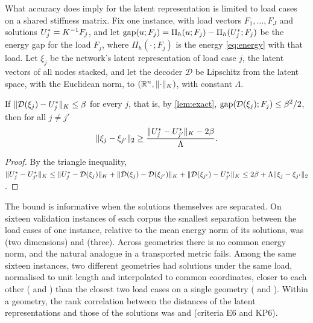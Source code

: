 What accuracy does imply for the latent representation is limited to load cases on a
shared stiffness matrix. Fix one instance, with load vectors $F_1,\dots,F_J$ and solutions
$U^{\ast}_j=K^{-1}F_j$, and let $\operatorname{gap}(u;F_j)=\Pi_h(u;F_j)-\Pi_h(U^{\ast}_j;F_j)$ be the energy
gap for the load $F_j$, where $\Pi_h(\cdot\,;F_j)$ is the energy \eqref{eq:energy} with that
load. Let $\xi_j$ be the network's latent representation of load case $j$, the latent vectors
of all nodes stacked, and let the decoder $\mathcal{D}$ be Lipschitz from the latent space, with the
Euclidean norm, to $(\mathbb{R}^{n},\lVert \cdot\rVert_K)$, with constant $\Lambda$.

\begin{proposition}\label{prop:sep}
If $\lVert \mathcal{D}(\xi_j)-U^{\ast}_j\rVert_K\le\beta$ for every $j$, that is, by \cref{lem:exact},
$\operatorname{gap}(\mathcal{D}(\xi_j);F_j)\le\beta^2/2$, then for all $j\neq j'$
\begin{equation}
\lVert \xi_j-\xi_{j'}\rVert_2 \ge \frac{\lVert U^{\ast}_j-U^{\ast}_{j'}\rVert_K-2\beta}{\Lambda}.
\label{eq:sep}
\end{equation}
\end{proposition}

\begin{proof}
By the triangle inequality,
$\lVert U^{\ast}_j-U^{\ast}_{j'}\rVert_K\le\lVert U^{\ast}_j-\mathcal{D}(\xi_j)\rVert_K
+\lVert \mathcal{D}(\xi_j)-\mathcal{D}(\xi_{j'})\rVert_K
+\lVert \mathcal{D}(\xi_{j'})-U^{\ast}_{j'}\rVert_K\le2\beta+\Lambda\lVert \xi_j-\xi_{j'}\rVert_2$.
\end{proof}

The bound is informative when the solutions themselves are separated. On sixteen validation instances of each corpus the smallest separation between the load cases of one
instance, relative to the mean energy norm of its solutions, was \numPremiseTwo{} (two
dimensions) and \numPremiseThree{} (three). Across geometries there is no common energy
norm, and the natural analogue in a transported metric fails. Among the same sixteen instances, two different geometries had solutions under the same load, normalised to unit
length and interpolated to common coordinates, closer to each other (\numCrossTwo{} and
\numCrossThree{}) than the closest two load cases on a single geometry (\numWithinTwo{} and
\numWithinThree{}). Within a geometry, the rank correlation between the distances of the
latent representations and those of the solutions was \numRhoTwo{} and \numRhoThree{}
(criteria E6 and KP6).



